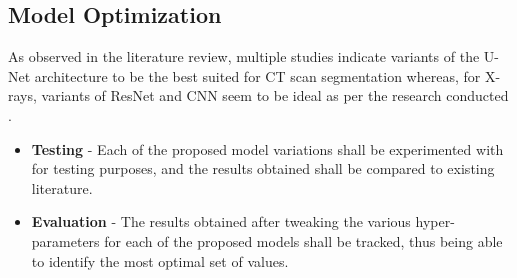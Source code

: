 \subsection{Model Optimization}
As observed in the literature review, multiple studies \cite{CXZ+2020, CYZ+2020, HLR+2020, YHQ+2020, GOM+2020, LLL+2020, CJL+2020, JSB+2020, SFY+2020} indicate variants of the U-Net architecture to be the best suited for CT scan segmentation whereas, for X-rays, variants of ResNet and CNN seem to be ideal as per the research conducted \cite{ZXS+2020, AKP2020, GHT2020, LWA2020}.
\begin{itemize}
    \item \textbf{Testing} - Each of the proposed model variations shall be experimented with for testing purposes, and the results obtained shall be compared to existing literature. 
     \item \textbf{Evaluation} - The results obtained after tweaking the various hyper-parameters for each of the proposed models shall be tracked, thus being able to identify the most optimal set of values.
\end{itemize}



